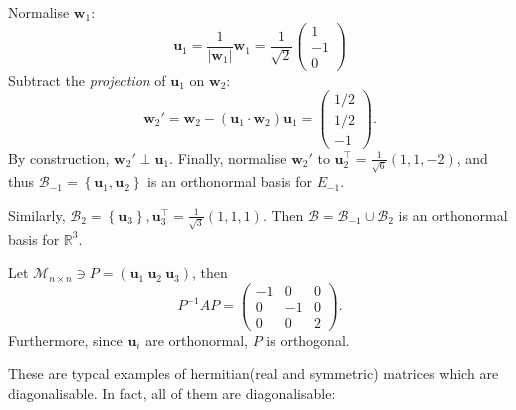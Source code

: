\documentclass[a4paper]{article}
\begin{document}
\begin{example}
\begin{enumerate}[(i)]
\[          \]
          Normalise $\mathbf{w}_1$:
          \[
            \mathbf{u}_1=\frac{1}{|\mathbf{w}_1|}\mathbf{w}_1=\frac{1}{\sqrt{2}}
            \begin{pmatrix}
              1\\-1\\0
            \end{pmatrix}
          \]
          Subtract the \textit{projection} of $\mathbf{u}_1$ on $\mathbf{w}_2$:
          \[
            \mathbf{w}_2'=\mathbf{w}_2-(\mathbf{u}_1 \cdot
            \mathbf{w}_2)\mathbf{u}_1=
            \begin{pmatrix}
              1/2\\1/2\\-1
            \end{pmatrix}.
          \]
          By construction, $ \mathbf{w}_2' \perp \mathbf{u}_1 $.
          Finally, normalise $ \mathbf{w}_2' $ to $
          \mathbf{u}_2^{\top}=\frac{1}{\sqrt{6}}(1,1,-2) $, and thus
          $ \mathcal{B}_{-1}=\left\{ \mathbf{u}_1,\mathbf{u}_2
          \right\} $ is an orthonormal basis for $ E_{-1} $.

          Similarly, $ \mathcal{B}_2=\left\{ \mathbf{u}_3 \right\} ,
          \mathbf{u}_3^{\top}=\frac{1}{\sqrt{3}}(1,1,1)$. Then $
          \mathcal{B}=\mathcal{B}_{-1}\cup \mathcal{B}_2 $ is an
          orthonormal basis for $ \mathbb{R}^{3} $.

          Let $ \mathcal{M}_{n\times n}\ni
          P=(\mathbf{u}_1\ \mathbf{u}_2\ \mathbf{u}_3) $, then
          \[
            P^{-1}AP=
            \begin{pmatrix}
              -1&0&0\\
              0&-1&0\\
              0&0&2
            \end{pmatrix}.
          \]
          Furthermore, since $ \mathbf{u}_i $ are orthonormal, $ P $
          is orthogonal.
      \end{enumerate}
    \end{example}
    These are typcal examples of hermitian(real and symmetric)
    matrices which are diagonalisable. In fact, all of them are diagonalisable:
\end{document}
